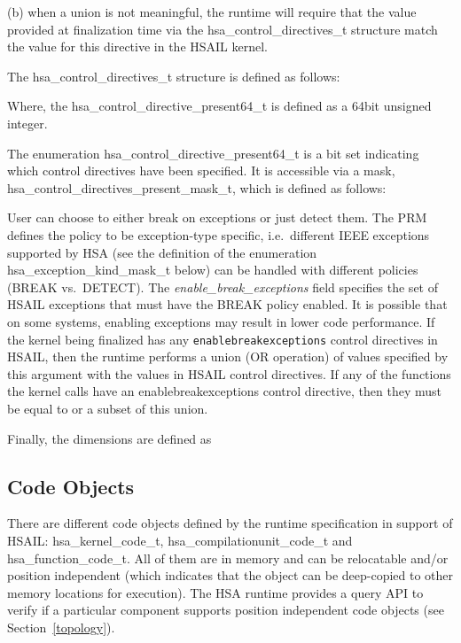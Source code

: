 \documentclass[draft]{book}
\newcommand{\reffld}[1]{\textit{#1}}
\newcommand{\reftyp}[1]{#1}
\begin{document}
\begin{appendices}
(b) when a union is not meaningful, the runtime will require that the value
provided at finalization time via the \reftyp{hsa_control_directives_t}
structure match the value for this directive in the HSAIL kernel.

The \reftyp{hsa_control_directives_t} structure is defined as
follows:



Where, the \reftyp{hsa_control_directive_present64_t} is defined as a 64bit
unsigned integer.


The enumeration \reftyp{hsa_control_directive_present64_t} is a bit set
indicating which control directives have been specified. It is accessible via a
mask, \reftyp{hsa_control_directives_present_mask_t}, which is defined as
follows:



User can choose to either break on exceptions or just detect them. The PRM
defines the policy to be exception-type specific, i.e.\ different IEEE
exceptions supported by HSA (see the definition of the enumeration
\reftyp{hsa_exception_kind_mask_t} below) can be handled with different
policies (BREAK vs.\ DETECT). The \reffld{enable_break_exceptions} field
specifies the set of HSAIL exceptions that must have the BREAK policy
enabled. It is possible that on some systems, enabling exceptions may result in
lower code performance. If the kernel being finalized has any
\texttt{enablebreakexceptions} control directives in HSAIL, then the runtime
performs a union (OR operation) of values specified by this argument with the
values in HSAIL control directives. If any of the functions the kernel calls
have an enablebreakexceptions control directive, then they must be equal to or a
subset of this union.



Finally, the dimensions are defined as


\subsection{Code Objects}\label{finalize:codeobject}

There are different code objects defined by the runtime specification in support
of HSAIL: \reftyp{hsa_kernel_code_t}, \reftyp{hsa_compilationunit_code_t}
and \reftyp{hsa_function_code_t}. All of them are in memory and can be
relocatable and/or position independent (which indicates that the object can be
deep-copied to other memory locations for execution). The HSA runtime provides a
query API to verify if a particular component supports position independent code
objects (see Section~\ref{topology}).


\end{appendices}
\end{document}
